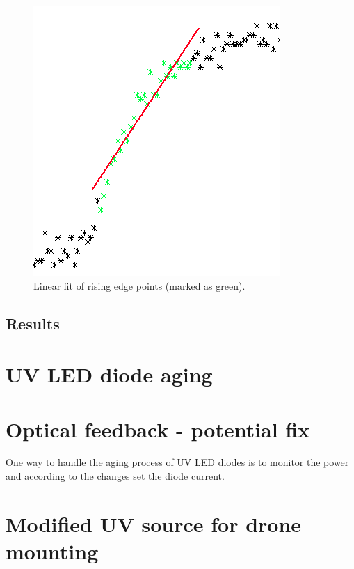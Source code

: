  \begin{figure}[H]
 \centering
 \includegraphics[scale=0.65]{./pictures/linFit}
 \caption{Linear fit of rising edge points (marked as green).}
 \label{linfit}
\end{figure}


\subsection{Results}

\section{UV LED diode aging}

\section{Optical feedback - potential fix}
One way to handle the aging process of UV LED diodes is to monitor the power and according to the changes set the diode current. 



\section{Modified UV source for drone mounting}



